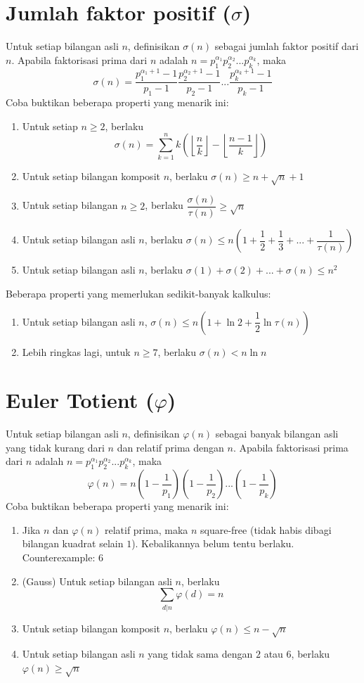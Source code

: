 \documentclass[11pt]{scrartcl}
\begin{document}
\section{Jumlah faktor positif ($\sigma$)}
Untuk setiap bilangan asli $n$, definisikan $\sigma(n)$ sebagai jumlah faktor positif dari $n$. Apabila faktorisasi prima dari $n$ adalah $n = p_1^{\alpha_1}p_2^{\alpha_2}...p_k^{\alpha_k}$, maka \[\sigma(n) = \frac{p_1^{\alpha_1 + 1} - 1}{p_1 - 1}\frac{p_2^{\alpha_2 + 1} - 1}{p_2 - 1}...\frac{p_k^{\alpha_k + 1} - 1}{p_k - 1}\]
Coba buktikan beberapa properti yang menarik ini:
\begin{enumerate}
    \item Untuk setiap $n \geq 2$, berlaku \[\sigma(n) = \sum_{k = 1}^n k\left(\left\lfloor \dfrac{n}{k}\right\rfloor - \left\lfloor \dfrac{n - 1}{k}\right\rfloor\right)\]
    \item Untuk setiap bilangan komposit $n$, berlaku $\sigma(n) \geq n + \sqrt{n} + 1$
    \item Untuk setiap bilangan $n \geq 2$, berlaku $\dfrac{\sigma(n)}{\tau(n)} \geq \sqrt{n}$
    \item Untuk setiap bilangan asli $n$, berlaku $\sigma(n) \leq n\left(1 + \dfrac{1}{2} + \dfrac{1}{3} + ... + \dfrac{1}{\tau(n)}\right)$
    \item Untuk setiap bilangan asli $n$, berlaku $\sigma(1) + \sigma(2) + ... + \sigma(n) \leq n^2$
\end{enumerate}

Beberapa properti yang memerlukan sedikit-banyak kalkulus:
\begin{enumerate}
    \item Untuk setiap bilangan asli $n$, $\sigma(n) \leq n\left(1 + \ln{2} +  \dfrac{1}{2}\ln{\tau(n)}\right)$
    \item Lebih ringkas lagi, untuk $n \geq 7$, berlaku $\sigma(n) < n\ln{n}$
\end{enumerate}

\section{Euler Totient ($\varphi$)}
Untuk setiap bilangan asli $n$, definisikan $\varphi(n)$ sebagai banyak bilangan asli yang tidak kurang dari $n$ dan relatif prima dengan $n$. Apabila faktorisasi prima dari $n$ adalah $n = p_1^{\alpha_1}p_2^{\alpha_2}...p_k^{\alpha_k}$, maka \[\varphi(n) = n\left(1 - \dfrac{1}{p_1}\right)\left(1 - \dfrac{1}{p_2}\right)...\left(1 - \dfrac{1}{p_k}\right)\]
Coba buktikan beberapa properti yang menarik ini:
\begin{enumerate}
    \item Jika $n$ dan $\varphi(n)$ relatif prima, maka $n$ square-free (tidak habis dibagi bilangan kuadrat selain $1$). Kebalikannya belum tentu berlaku. Counterexample: $6$
    \item (Gauss) Untuk setiap bilangan asli $n$, berlaku \[\sum_{d|n} \varphi(d) = n\]
    \item Untuk setiap bilangan komposit $n$, berlaku $\varphi(n) \leq n - \sqrt{n}$
    \item Untuk setiap bilangan asli $n$ yang tidak sama dengan $2$ atau $6$, berlaku $\varphi(n) \geq \sqrt{n}$
\end{enumerate}
\end{document}

